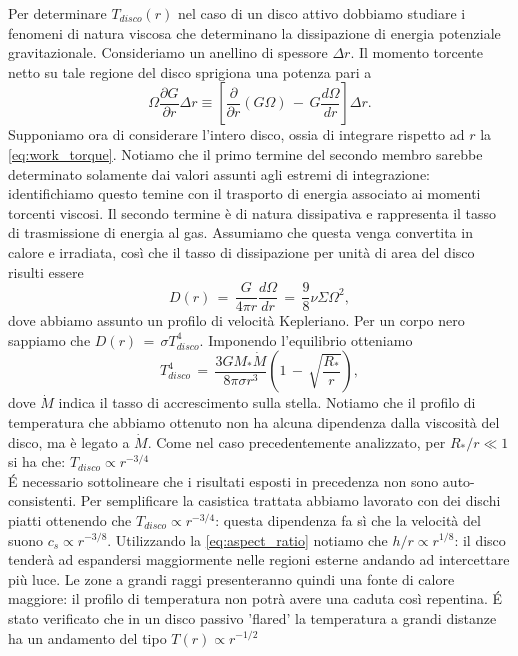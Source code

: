 Per determinare $T_{disco}\left(r\right)$ nel caso di un disco attivo dobbiamo studiare i fenomeni di natura viscosa che determinano la dissipazione di energia potenziale gravitazionale. Consideriamo un anellino di spessore $\Delta r$. Il momento torcente netto su tale regione del disco sprigiona una potenza pari a
\begin{equation}
\Omega \frac{\partial G}{\partial r} \Delta r \equiv \left[\frac{\partial}{\partial r}\left(G\Omega\right)\,-\,G\frac{d\Omega}{dr}\right] \Delta r.
\label{eq:work_torque}
\end{equation}
Supponiamo ora di considerare l'intero disco, ossia di integrare rispetto ad $r$ la \eqref{eq:work_torque}. Notiamo che il primo termine del secondo membro sarebbe determinato solamente dai valori assunti agli estremi di integrazione: identifichiamo questo temine con il trasporto di energia associato ai momenti torcenti viscosi.
Il secondo termine è di natura dissipativa e rappresenta il tasso di trasmissione di energia al gas. Assumiamo che questa venga convertita in calore e irradiata,  così che il tasso di dissipazione per unità di area del disco risulti essere
\begin{equation}
D\left(r\right)\,=\,\frac{G}{4\pi r} \frac{d\Omega}{dr}\,=\,\frac{9}{8}\nu\Sigma\Omega^2, 
\label{eq:diss_visc}
\end{equation}
dove abbiamo assunto un profilo di velocità Kepleriano. Per un corpo nero sappiamo che $D\left(r\right)\,=\,\sigma T_{disco}^4$. Imponendo l'equilibrio otteniamo
\begin{equation}
T^4_{disco}\,=\,\frac{3GM_\ast\dot{M}}{8\pi\sigma r^3}\left(1\,-\,\sqrt{\frac{R_\ast}{r}}\right),
\label{eq:ptemp_act}
\end{equation}
dove $\dot{M}$ indica il tasso di accrescimento sulla stella. Notiamo che il profilo di temperatura che abbiamo ottenuto non ha alcuna dipendenza dalla viscosità del disco, ma è legato a $\dot{M}$. Come nel caso precedentemente analizzato, per $R_\ast/r \ll 1$ si ha che: $T_{disco} \propto r^{-3/4}$\\

\'E necessario sottolineare che i risultati esposti in precedenza non sono auto-consistenti. Per semplificare la casistica trattata abbiamo lavorato con dei dischi piatti ottenendo che $T_{disco} \propto r^{-3/4}$: questa dipendenza fa sì che la velocità del suono $c_s \propto r^{-3/8}$. 
Utilizzando la \eqref{eq:aspect_ratio} notiamo che $h/r \propto r^{1/8}$: il disco tenderà ad espandersi maggiormente nelle regioni esterne andando ad intercettare più luce. Le zone a grandi raggi presenteranno quindi una fonte di calore maggiore: il profilo di temperatura non potrà avere una caduta così repentina. 
\'E stato verificato che in un disco passivo 'flared' la temperatura a grandi distanze ha un andamento del tipo $T\left(r\right)\propto r^{-1/2}$ \parencite{KenyonHartmann1987}

